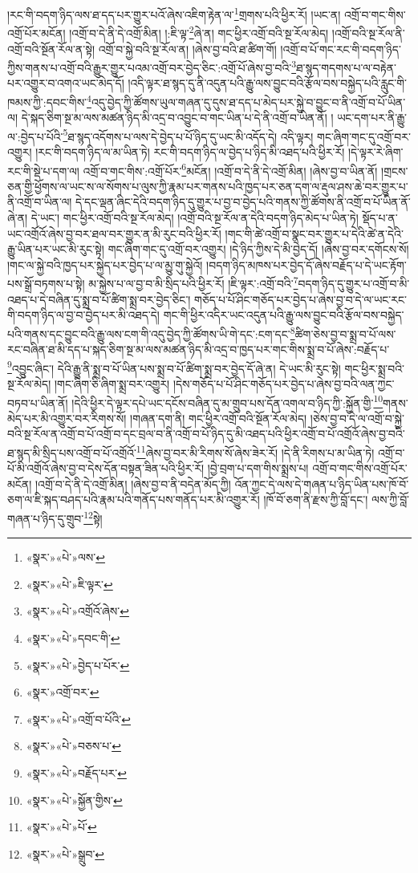 །རང་གི་བདག་ཉིད་ལས་ཐ་དད་པར་གྱུར་པའོ་ཞེས་འཇིག་རྟེན་ལ་\footnote{«སྣར་»«པེ་»ལས་}གྲགས་པའི་ཕྱིར་རོ། །ཡང་ན། འགྲོ་བ་གང་གིས་འགྲོ་པོར་མངོན། །འགྲོ་བ་དེ་ནི་དེ་འགྲོ་མིན། །:ཇི་ལྟ་\footnote{«སྣར་»«པེ་»ཇི་ལྟར་}ཞེ་ན། གང་ཕྱིར་འགྲོ་བའི་སྔ་རོལ་མེད། །འགྲོ་བའི་སྔ་རོལ་ནི་འགྲོ་བའི་སྔོན་རོལ་ན་སྟེ། འགྲོ་བ་སྐྱེ་བའི་སྔ་རོལ་ན། །ཞེས་བྱ་བའི་ཐ་ཚིག་གོ། །འགྲོ་བ་པོ་གང་རང་གི་བདག་ཉིད་ཀྱིས་གནས་པ་འགྲོ་བའི་རྒྱུར་གྱུར་པའམ་འགྲོ་བར་བྱེད་ཅིང་:འགྲོ་པོ་ཞེས་བྱ་བའི་\footnote{«སྣར་»«པེ་»འགྲོའོ་ཞེས་}ཐ་སྙད་གདགས་པ་ལ་བརྟེན་པར་འགྱུར་བ་འགའ་ཡང་མེད་དོ། །འདི་ལྟར་ཐ་སྙད་དུ་ནི་འདུན་པའི་རྒྱུ་ལས་བྱུང་བའི་རྩོལ་བས་བསྐྱེད་པའི་རླུང་གི་ཁམས་ཀྱི་:དབང་གིས་\footnote{«སྣར་»«པེ་»དབང་གི་}འདུ་བྱེད་ཀྱི་ཚོགས་ཡུལ་གཞན་དུ་དུས་ཐ་དད་པ་མེད་པར་སྐྱེ་བ་བྱུང་བ་ནི་འགྲོ་བ་པོ་ཡིན་ལ། དེ་སྐད་ཅིག་སྔ་མ་ལས་མཚན་ཉིད་མི་འདྲ་བ་འབྱུང་བ་གང་ཡིན་པ་དེ་ནི་འགྲོ་བ་ཡིན་ནོ། །
ཡང་དག་པར་ནི་རྒྱུ་ལ་:བྱེད་པ་པོའི་\footnote{«སྣར་»«པེ་»བྱེད་པ་པོར་}ཐ་སྙད་འདོགས་པ་ལས་དེ་བྱེད་པ་པོ་ཉིད་དུ་ཡང་མི་འདོད་དེ། འདི་ལྟར། གང་ཞིག་གང་དུ་འགྲོ་བར་འགྱུར། །རང་གི་བདག་ཉིད་ལ་མ་ཡིན་ཏེ། རང་གི་བདག་ཉིད་ལ་བྱེད་པ་ཉིད་མི་འཐད་པའི་ཕྱིར་རོ། །དེ་ལྟར་རེ་ཞིག་རང་གི་སྡེ་པ་དག་ལ། འགྲོ་བ་གང་གིས་:འགྲོ་པོར་\footnote{«སྣར་»འགྲོ་བར་}མངོན། །འགྲོ་བ་དེ་ནི་དེ་འགྲོ་མིན། །ཞེས་བྱ་བ་ཡིན་ནོ། །གྲངས་ཅན་གྱི་ཕྱོགས་ལ་ཡང་ས་ལ་སོགས་པ་ལུས་ཀྱི་རྣམ་པར་གནས་པའི་ཁྱད་པར་ཅན་དག་ལ་རྡུལ་ཤས་ཆེ་བར་གྱུར་པ་ནི་འགྲོ་བ་ཡིན་ལ། དེ་དང་ལྡན་ཞིང་དེའི་བདག་ཉིད་དུ་གྱུར་པ་བྱ་བ་བྱེད་པའི་གནས་ཀྱི་ཚོགས་ནི་འགྲོ་བ་པོ་ཡིན་ནོ་ཞེ་ན། དེ་ཡང་། གང་ཕྱིར་འགྲོ་བའི་སྔ་རོལ་མེད། །འགྲོ་བའི་སྔ་རོལ་ན་དེའི་བདག་ཉིད་མེད་པ་ཡིན་ཏེ། སྡོད་པ་ན་ཡང་འགྲོའོ་ཞེས་བྱ་བར་ཐལ་བར་གྱུར་ན་མི་རུང་བའི་ཕྱིར་རོ། །གང་གི་ཚེ་འགྲོ་བ་སྣང་བར་གྱུར་པ་དེའི་ཚེ་ན་དེའི་རྒྱུ་ཡིན་པར་ཡང་མི་རུང་སྟེ། གང་ཞིག་གང་དུ་འགྲོ་བར་འགྱུར། །དེ་ཉིད་ཀྱིས་དེ་མི་བྱེད་དོ། །ཞེས་བྱ་བར་དགོངས་སོ། །གང་ལ་སྐྱེ་བའི་ཁྱད་པར་སྐྱེད་པར་བྱེད་པ་ལ་མྱུ་གུ་སྐྱེའོ། །བདག་ཉིད་མཁས་པར་བྱེད་དོ་ཞེས་བརྗོད་པ་དེ་ཡང་རྟོག་པས་སྒྲོ་བཏགས་པ་སྟེ། མ་སྐྱེས་པ་ལ་བྱ་བ་མི་སྲིད་པའི་ཕྱིར་རོ། །ཇི་ལྟར་:འགྲོ་བའི་\footnote{«སྣར་»«པེ་»འགྲོ་བ་པོའི་}བདག་ཉིད་དུ་གྱུར་པ་འགྲོ་བ་མི་འཐད་པ་དེ་བཞིན་དུ་སྨྲ་བ་པོ་ཚིག་སྨྲ་བར་བྱེད་ཅིང་། གཅོད་པ་པོ་ཤིང་གཅོད་པར་བྱེད་པ་ཞེས་བྱ་བ་དེ་ལ་ཡང་རང་གི་བདག་ཉིད་ལ་བྱ་བ་བྱེད་པར་མི་འཐད་དེ། གང་གི་ཕྱིར་འདིར་ཡང་འདུན་པའི་རྒྱུ་ལས་བྱུང་བའི་རྩོལ་བས་བསྐྱེད་པའི་གནས་དང་བྱུང་བའི་རྒྱུ་ལས་ངག་གི་འདུ་བྱེད་ཀྱི་ཚོགས་ཡི་གེ་དང་:ངག་དང་\footnote{«སྣར་»«པེ་»བཅས་པ་}ཚིག་ཅེས་བྱ་བ་སྨྲ་བ་པོ་ལས་རང་བཞིན་ཐ་མི་དད་པ་སྐད་ཅིག་སྔ་མ་ལས་མཚན་ཉིད་མི་འདྲ་བ་ཁྱད་པར་གང་གིས་སྨྲ་བ་པོ་ཞེས་:བརྗོད་པ་\footnote{«སྣར་»«པེ་»བརྗོད་པར་}འབྱུང་ཞིང་། དེའི་རྒྱུ་ནི་སྨྲ་བ་པོ་ཡིན་པས་སྨྲ་བ་པོ་ཚིག་སྨྲ་བར་བྱེད་དོ་ཞེ་ན། དེ་ཡང་མི་རུང་སྟེ། གང་ཕྱིར་སྨྲ་བའི་སྔ་རོལ་མེད། །གང་ཞིག་ཅི་ཞིག་སྨྲ་བར་འགྱུར། །དེས་གཅོད་པ་པོ་ཤིང་གཅོད་པར་བྱེད་པ་ཞེས་བྱ་བའི་ལན་ཀྱང་བཏབ་པ་ཡིན་ནོ། །དེའི་ཕྱིར་དེ་ལྟར་དཔེ་ཡང་དངོས་བཞིན་དུ་མ་གྲུབ་པས་དོན་འགལ་བ་ཉིད་ཀྱི་:སྐྱོན་གྱི་\footnote{«སྣར་»«པེ་»སྐྱོན་གྱིས་}གནས་མེད་པར་མི་འགྱུར་བར་རིགས་སོ། །གཞན་དག་ནི། གང་ཕྱིར་འགྲོ་བའི་སྔོན་རོལ་མེད། །ཅེས་བྱ་བ་དེ་ལ་འགྲོ་བ་སྐྱེ་བའི་སྔ་རོལ་ན་འགྲོ་བ་པོ་འགྲོ་བ་དང་བྲལ་བ་ནི་འགྲོ་བ་པོ་ཉིད་དུ་མི་འཐད་པའི་ཕྱིར་འགྲོ་བ་པོ་འགྲོའོ་ཞེས་བྱ་བའི་ཐ་སྙད་མི་སྲིད་པས་འགྲོ་བ་པོ་འགྲོའོ་\footnote{«སྣར་»«པེ་»པོ་}ཞེས་བྱ་བར་མི་རིགས་སོ་ཞེས་ཟེར་རོ། །དེ་ནི་རིགས་པ་མ་ཡིན་ཏེ། འགྲོ་བ་པོ་མི་འགྲོའོ་ཞེས་བྱ་བ་དེས་དོན་བསྟན་ཟིན་པའི་ཕྱིར་རོ། །བྱེ་བྲག་པ་དག་གིས་སྨྲས་པ། འགྲོ་བ་གང་གིས་འགྲོ་པོར་མངོན། །འགྲོ་བ་དེ་ནི་དེ་འགྲོ་མིན། །ཞེས་བྱ་བ་ནི་བདེན་མོད་ཀྱི། འོན་ཀྱང་དེ་ལས་དེ་གཞན་པ་ཉིད་ཡིན་པས་ཁོ་བོ་ཅག་ལ་ཇི་སྐད་བཤད་པའི་རྣམ་པའི་གནོད་པས་གནོད་པར་མི་འགྱུར་རོ། །ཁོ་བོ་ཅག་ནི་རྫས་ཀྱི་བློ་དང་། ལས་ཀྱི་བློ་གཞན་པ་ཉིད་དུ་གྲུབ་\footnote{«སྣར་»«པེ་»སྒྲུབ་}སྟེ། 